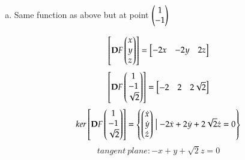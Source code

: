 \begin{enumerate}[a.]
  \item Same function as above but at point $\Point{1 \\ -1}$

  \[\mtrx{\bm{D}F\Point{x \\ y \\ z}}=\mtrx{-2x & -2y & 2z}\]
  \[\mtrx{\bm{D}F\Point{1 \\ -1 \\ \sqrt{2}}}=\mtrx{-2 & 2 & 2\sqrt{2}}\]
  \[ker \mtrx{\bm{D}F\Point{1 \\ -1 \\ \sqrt{2}}}=\Set{\Point{\dot{x} \\ \dot{y} \\ \dot{z}} \bigm| -2\dot{x} +2\dot{y} +2\sqrt{2}\dot{z}=0}\]
  \[tangent\ plane : -x + y + \sqrt{2}z = 0\]

\end{enumerate}
